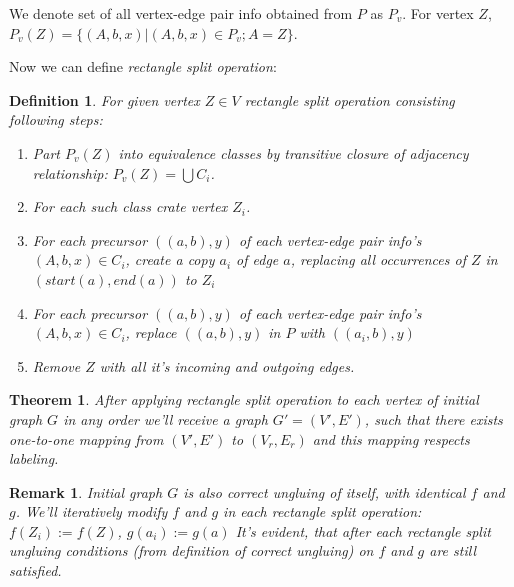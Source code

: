 \documentclass[12pt,a4paper,oneside]{article}
\newtheorem{theorem}{Theorem}
\newtheorem{definition}{Definition}
\newtheorem{remark}{Remark}
\begin{document}
We denote set of all vertex-edge pair info obtained from $P$ as $P_v$.
For vertex $Z$, $P_v(Z) = \{(A, b, x)|(A, b, x) \in P_v; A = Z\}$.
 
Now we can define \emph{rectangle split operation}:
\begin{definition}
For given vertex $Z \in V$ rectangle split operation consisting following steps:
\begin{enumerate}
\item Part $P_v(Z)$ into equivalence classes by transitive closure of adjacency relationship: $P_v(Z) = \bigcup C_i$. 
\item For each such class crate vertex $Z_i$.
\item For each precursor $((a, b), y)$ of each vertex-edge pair info's $(A, b, x) \in C_i$,  create a copy $a_i$ of edge $a$, replacing all occurrences of $Z$ in $(start(a), end(a))$ to $Z_i$  
\item For each precursor $((a, b), y)$ of each vertex-edge pair info's $(A, b, x) \in C_i$, replace $((a, b), y)$ in $P$ with $((a_i, b), y)$
\item Remove $Z$ with all it's incoming and outgoing edges.
\end{enumerate} 
\end{definition} 
\begin{theorem}
  After applying rectangle split operation to each vertex of initial graph $G$ in any order we'll receive a graph $G' = (V', E')$, such that there exists one-to-one mapping from $(V', E')$ to $(V_r, E_r)$ and this mapping respects labeling.
\end{theorem}
\begin{remark}
 Initial graph $G$ is also correct ungluing of itself, with identical $f$ and $g$. We'll iteratively modify $f$ and $g$ in each rectangle split operation:
$f(Z_i):= f(Z)$, $g(a_i):= g(a)$
 It's evident, that after each rectangle split ungluing conditions (from definition of correct ungluing) on $f$ and $g$ are still satisfied.
\end{remark}
\end{document}
